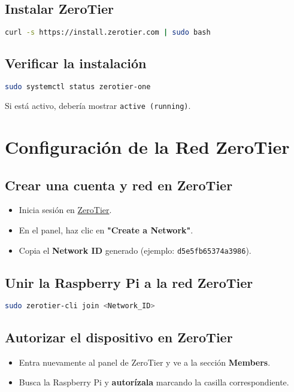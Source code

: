 \subsection{Instalar ZeroTier}
\begin{lstlisting}[language=bash]
curl -s https://install.zerotier.com | sudo bash
\end{lstlisting}

\subsection{Verificar la instalación}
\begin{lstlisting}[language=bash]
sudo systemctl status zerotier-one
\end{lstlisting}
Si está activo, debería mostrar \texttt{active (running)}.


\section{Configuración de la Red ZeroTier}

\subsection{Crear una cuenta y red en ZeroTier}
\begin{itemize}
    \item Inicia sesión en \href{https://my.zerotier.com}{ZeroTier}.
    \item En el panel, haz clic en \textbf{"Create a Network"}.
    \item Copia el \textbf{Network ID} generado (ejemplo: \texttt{d5e5fb65374a3986}).
\end{itemize}

\subsection{Unir la Raspberry Pi a la red ZeroTier}
\begin{lstlisting}[language=bash]
sudo zerotier-cli join <Network_ID>
\end{lstlisting}

\subsection{Autorizar el dispositivo en ZeroTier}
\begin{itemize}
    \item Entra nuevamente al panel de ZeroTier y ve a la sección \textbf{Members}.
    \item Busca la Raspberry Pi y \textbf{autorízala} marcando la casilla correspondiente.
\end{itemize}

